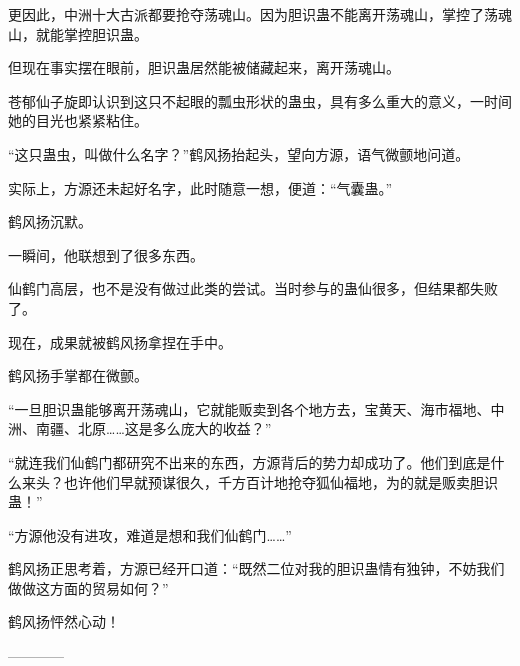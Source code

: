 \begin{this_body}
更因此，中洲十大古派都要抢夺荡魂山。因为胆识蛊不能离开荡魂山，掌控了荡魂山，就能掌控胆识蛊。

但现在事实摆在眼前，胆识蛊居然能被储藏起来，离开荡魂山。

苍郁仙子旋即认识到这只不起眼的瓢虫形状的蛊虫，具有多么重大的意义，一时间她的目光也紧紧粘住。

“这只蛊虫，叫做什么名字？”鹤风扬抬起头，望向方源，语气微颤地问道。

实际上，方源还未起好名字，此时随意一想，便道：“气囊蛊。”

鹤风扬沉默。

一瞬间，他联想到了很多东西。

仙鹤门高层，也不是没有做过此类的尝试。当时参与的蛊仙很多，但结果都失败了。

现在，成果就被鹤风扬拿捏在手中。

鹤风扬手掌都在微颤。

“一旦胆识蛊能够离开荡魂山，它就能贩卖到各个地方去，宝黄天、海市福地、中洲、南疆、北原……这是多么庞大的收益？”

“就连我们仙鹤门都研究不出来的东西，方源背后的势力却成功了。他们到底是什么来头？也许他们早就预谋很久，千方百计地抢夺狐仙福地，为的就是贩卖胆识蛊！”

“方源他没有进攻，难道是想和我们仙鹤门……”

鹤风扬正思考着，方源已经开口道：“既然二位对我的胆识蛊情有独钟，不妨我们做做这方面的贸易如何？”

鹤风扬怦然心动！

------------

\end{this_body}

